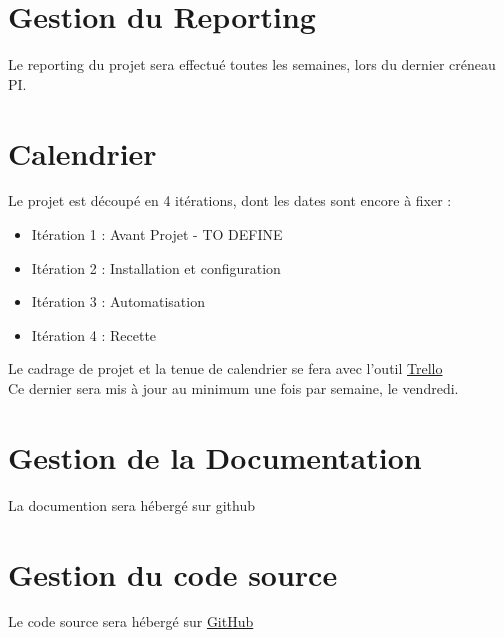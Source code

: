 \documentclass[14pt,a4paper]{extarticle}
\begin{document}
\break
\section{Gestion du Reporting}
Le reporting du projet sera effectué toutes les semaines, lors du dernier créneau PI.
\section{Calendrier}
Le projet est découpé en 4 itérations, dont les dates sont encore à fixer :
\begin{itemize}
    \item{Itération 1 : Avant Projet - TO DEFINE}
    \item{Itération 2 : Installation et configuration}
    \item{Itération 3 : Automatisation}
    \item{Itération 4 : Recette}
\end{itemize}
Le cadrage de projet et la tenue de calendrier se fera avec l'outil \href{https://trello.com/b/99BYE8cx/forbiddenapplepy}{Trello} \\
Ce dernier sera mis à jour au minimum une fois par semaine, le vendredi.
\section{Gestion de la Documentation}
La documention sera hébergé sur github
\section{Gestion du code source}
Le code source sera hébergé sur \href{https://github.com/ForbiddenApplePy}{GitHub}
\end{document}
